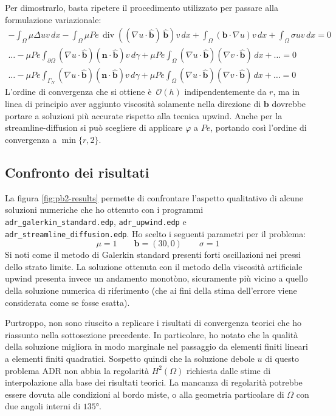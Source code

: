 \documentclass[a4paper]{article}
\renewcommand{\vec}[1]{\mathbf{#1}}
\DeclareMathOperator{\diver}{div}
\newcommand{\bhat}{\hat{\vec{b}}}
\newcommand{\bigO}[1]{\mathcal{O}\!\left(#1\right)}
\newcommand{\dx}{\, dx}
\newcommand{\dgamma}{\, d\gamma}
\begin{document}
Per dimostrarlo, basta ripetere il procedimento utilizzato per passare alla
formulazione variazionale:
\begin{gather*}
- \int_\Omega{\mu \Delta u v \dx}
- \int_\Omega{\mu Pe \, \diver((\nabla u \cdot \bhat) \, \bhat) v \dx}
+ \int_\Omega{(\vec{b} \cdot \nabla u) v \dx}
+ \int_\Omega{\sigma u v \dx} = 0 \\
\dots
- \mu Pe \int_{\partial \Omega}{(\nabla u \cdot \bhat) (\vec{n} \cdot \bhat) v \dgamma}
+ \mu Pe \int_\Omega{(\nabla u \cdot \bhat) (\nabla v \cdot \bhat) \dx}
+ \dots = 0 \\
\dots
- \mu Pe \int_{\Gamma_N}{(\nabla u \cdot \bhat) (\vec{n} \cdot \bhat) v \dgamma}
+ \mu Pe \int_\Omega{(\nabla u \cdot \bhat) (\nabla v \cdot \bhat) \dx}
+ \dots = 0
\end{gather*}
L'ordine di convergenza che si ottiene è~$\bigO{h}$ indipendentemente da $r$,
ma in linea di principio aver aggiunto viscosità solamente nella direzione di $\vec{b}$
dovrebbe portare a soluzioni più accurate rispetto alla tecnica upwind.
Anche per la streamline-diffusion si può scegliere di applicare $\varphi$ a $Pe$,
portando così l'ordine di convergenza a $\min\{r,2\}$.

\subsection{Confronto dei risultati}
La figura \ref{fig:pb2-results} permette di confrontare l'aspetto qualitativo
di alcune soluzioni numeriche che ho ottenuto con i programmi
\texttt{adr\_galerkin\_standard.edp}, \texttt{adr\_upwind.edp}
e \texttt{adr\_streamline\_diffusion.edp}.
Ho scelto i seguenti parametri per il problema:
\[
\mu = 1 \qquad \vec{b} = (30,0) \qquad \sigma = 1
\]
Si noti come il metodo di Galerkin standard presenti
forti oscillazioni nei pressi dello strato limite.
La soluzione ottenuta con il metodo della viscosità artificiale upwind
presenta invece un andamento monotòno, sicuramente più vicino a quello della
soluzione numerica di riferimento (che ai fini della stima dell'errore
viene considerata come se fosse esatta).

Purtroppo, non sono riuscito a replicare i risultati di
convergenza teorici che ho riassunto nella sottosezione precedente.
In particolare, ho notato che la qualità della soluzione migliora in modo
marginale nel passaggio da elementi finiti lineari a elementi finiti quadratici.
Sospetto quindi che la soluzione debole $u$ di questo problema ADR
non abbia la regolarità $H^2(\Omega)$ richiesta dalle stime di interpolazione
alla base dei risultati teorici.
La mancanza di regolarità potrebbe essere dovuta alle condizioni al bordo miste,
o alla geometria particolare di $\Omega$ con due angoli interni di $\ang{135}$.
\end{document}
